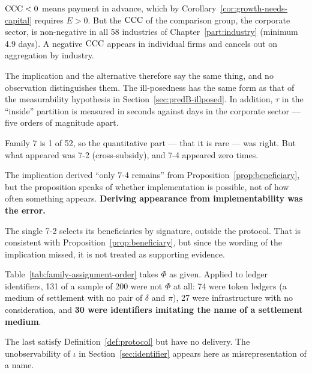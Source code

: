 \begin{remark}
\label{rem:phi3-illposed}
$\mathrm{CCC}<0$ means payment in advance, which by Corollary~\ref{cor:growth-needs-capital} requires
$E>0$. But the $\mathrm{CCC}$ of the comparison group, the corporate sector, is non-negative in all
58 industries of Chapter~\ref{part:industry} (minimum 4.9 days). A negative $\mathrm{CCC}$ appears in
individual firms and cancels out on aggregation by industry.

The implication and the alternative therefore say the same thing, and no observation
distinguishes them. The ill-posedness has the same form as that of the measurability
hypothesis in Section~\ref{sec:predB-illposed}. In addition, $\tau$ in the ``inside''
partition is measured in seconds against days in the corporate sector --- five orders of
magnitude apart.
\end{remark}

\begin{remark}
\label{rem:implementable-not-observed}
Family 7 is 1 of 52, so the quantitative part --- that it is rare --- was right. But what
appeared was 7-2 (cross-subsidy), and 7-4 appeared zero times.

The implication derived ``only 7-4 remains'' from Proposition~\ref{prop:beneficiary}, but the
proposition speaks of whether implementation is possible, not of how often something appears.
\textbf{Deriving appearance from implementability was the error.}

The single 7-2 selects its beneficiaries by signature, outside the protocol. That is
consistent with Proposition~\ref{prop:beneficiary}, but since the wording of the implication
missed, it is not treated as supporting evidence.
\end{remark}

\begin{remark}
\label{rem:is-it-phi}
Table~\ref{tab:family-assignment-order} takes $\Phi$ as given. Applied to ledger identifiers,
131 of a sample of 200 were not $\Phi$ at all: 74 were token ledgers (a medium of settlement
with no pair of $\delta$ and $\pi$), 27 were infrastructure with no consideration, and
\textbf{30 were identifiers imitating the name of a settlement medium}.

The last satisfy Definition~\ref{def:protocol} but have no delivery. The unobservability of
$\iota$ in Section~\ref{sec:identifier} appears here as misrepresentation of a name.
\end{remark}

